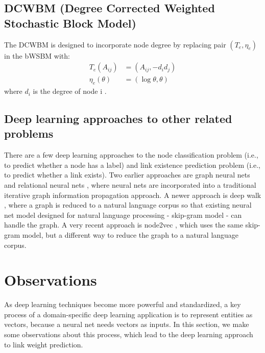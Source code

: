 \documentclass[conference]{IEEEtran}
\begin{document}
\subsection{DCWBM (Degree Corrected Weighted Stochastic Block Model)}
The DCWBM is designed to incorporate node degree
by replacing pair $ (T_e, \eta_e) $ in the bWSBM with:
\begin{align*}
	T_e(A_{ij}) &= (A_{ij}, -d_id_j)\\
	\eta_e(\theta) &= (\log\theta, \theta)
\end{align*}
where $ d_i $ is the degree of node i \cite{aicher2014learning}.

\subsection{Deep learning approaches to other related problems}
There are a few deep learning approaches to
the node classification problem (i.e., to predict whether a node has a label) and 
link existence prediction problem (i.e., to predict whether a link exists).
Two earlier approaches are graph neural nets and relational neural 
nets \cite{scarselli2009graph},
where neural nets are incorporated into a traditional iterative graph 
information propagation approach.
A newer approach is deep walk \cite{perozzi2014deepwalk}, 
where a graph is reduced to a natural language corpus so that existing neural 
net model designed for natural language processing - skip-gram model - can handle the graph.
A very recent approach is node2vec \cite{grovernode2vec},
which uses the same skip-gram model, 
but a different way to reduce the graph to a natural language corpus.

\section{Observations}
As deep learning techniques become more powerful and standardized,
a key process of a domain-specific deep learning application
is to represent entities as vectors,
because a neural net needs vectors as inputs.
In this section, we make some observations about this process,
which lead to the deep learning approach to link weight prediction.
\end{document}
